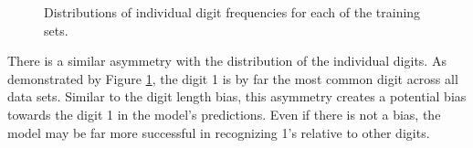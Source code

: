 \documentclass[12pt]{article}
\begin{document}
\begin{figure}[!htb]
\centering
{}\hfill
{}\hfill
{}\hfill
\caption{Distributions of individual digit frequencies for each of the training sets.}
\label{fig:digit_freq_plots}
\end{figure}

There is a similar asymmetry with the distribution of the individual digits.
As demonstrated by Figure \ref{fig:digit_freq_plots}, the digit 1 is by far the most common digit across all data sets.
Similar to the digit length bias, this asymmetry creates a potential bias towards the digit 1 in the model's predictions.
Even if there is not a bias, the model may be far more successful in recognizing 1's relative to other digits.
\end{document}
